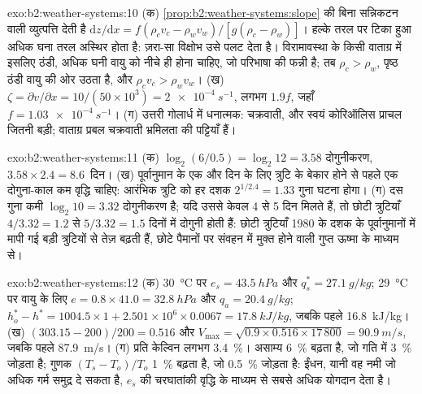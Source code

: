 \begin{solution}{exo:b2:weather-systems:10}
(क) \cref{prop:b2:weather-systems:slope} की बिना सन्निकटन वाली व्युत्पत्ति देती है
$\mathrm{d}z/\mathrm{d}x = f(\rho_c v_c - \rho_w v_w)/[g(\rho_c - \rho_w)]$। हल्के तरल पर
टिका हुआ अधिक घना तरल अस्थिर होता है: ज़रा-सा विक्षोभ उसे पलट देता है। विरामावस्था के किसी वाताग्र में
इसलिए ठंडी, अधिक घनी वायु को नीचे ही होना चाहिए, जो परिभाषा की फन्नी है; तब
$\rho_c > \rho_w$, पृष्ठ ठंडी वायु की ओर उठता है, और $\rho_c v_c > \rho_w v_w$।
(ख) $\zeta = \partial v/\partial x = 10/(50 \times 10^3) = \qty{2e-4}{s^{-1}}$, लगभग $1.9f$, जहाँ
$f = \qty{1.03e-4}{s^{-1}}$। (ग) उत्तरी गोलार्ध में धनात्मक: चक्रवाती, और स्वयं कोरिऑलिस प्राचल जितनी
बड़ी; वाताग्र प्रबल चक्रवाती भ्रमिलता की पट्टियाँ हैं।
\end{solution}

\begin{solution}{exo:b2:weather-systems:11}
(क) $\log_2(6/0.5) = \log_2 12 = 3.58$ दोगुनीकरण, $3.58 \times 2.4 = 8.6$~दिन। (ख) पूर्वानुमान के
एक और दिन के लिए त्रुटि के बेकार होने से पहले एक दोगुना-काल कम वृद्धि चाहिए:
आरंभिक त्रुटि को हर दशक $2^{1/2.4} = 1.33$ गुना घटना होगा। (ग) दस गुना कमी
$\log_2 10 = 3.32$ दोगुनीकरण है; यदि उससे केवल 4 से 5 दिन मिलते हैं, तो छोटी त्रुटियाँ $4/3.32 = 1.2$
से $5/3.32 = 1.5$ दिनों में दोगुनी होती हैं: छोटी त्रुटियाँ 1980 के दशक के पूर्वानुमानों में मापी गई बड़ी त्रुटियों से
तेज़ बढ़ती हैं, छोटे पैमानों पर संवहन में मुक्त होने वाली गुप्त ऊष्मा के माध्यम से।
\end{solution}

\begin{solution}{exo:b2:weather-systems:12}
(क) \qty{30}{\celsius} पर $e_s = \qty{43.5}{hPa}$ और $q_s^* = \qty{27.1}{g/kg}$; \qty{29}{\celsius} पर
वायु के लिए $e = 0.8 \times 41.0 = \qty{32.8}{hPa}$ और $q_a = \qty{20.4}{g/kg}$;
$h_o^* - h^* = 1004.5 \times 1 + 2.501 \times 10^6 \times 0.0067 = \qty{17.8}{kJ/kg}$, जबकि पहले
\qty{16.8}{kJ/kg}। (ख) $(303.15 - 200)/200 = 0.516$ और $V_{\max} = \sqrt{0.9 \times 0.516
\times 17\,800} = \qty{90.9}{m/s}$, जबकि पहले \qty{87.9}{m/s}। (ग) प्रति केल्विन लगभग \qty{3.4}{\percent}।
असाम्य \qty{6}{\percent} बढ़ता है, जो गति में \qty{3}{\percent} जोड़ता है;
गुणक $(T_s - T_o)/T_o$ \qty{1}{\percent} बढ़ता है, जो \qty{0.5}{\percent} जोड़ता है:
ईंधन, यानी वह नमी जो अधिक गर्म समुद्र दे सकता है, $e_s$ की चरघातांकी वृद्धि के माध्यम से
सबसे अधिक योगदान देता है।
\end{solution}


